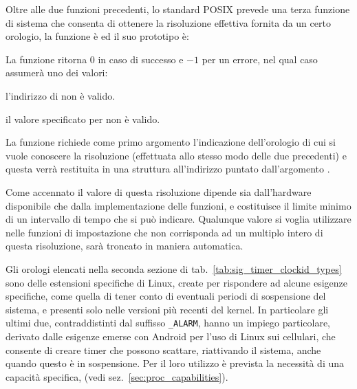 Oltre alle due funzioni precedenti, lo standard POSIX prevede una terza
funzione di sistema che consenta di ottenere la risoluzione effettiva fornita
da un certo orologio, la funzione è  ed il suo prototipo
è:

\begin{funcproto}{
}

{La funzione ritorna $0$ in caso di successo e $-1$ per un errore, nel qual
  caso  assumerà uno dei valori: 
  \begin{errlist}
  \item[\errcode{EFAULT}] l'indirizzo di  non è valido.
  \item[\errcode{EINVAL}] il valore specificato per  non è
    valido.
  \end{errlist}
}
\end{funcproto}

La funzione richiede come primo argomento l'indicazione dell'orologio di cui
si vuole conoscere la risoluzione (effettuata allo stesso modo delle due
precedenti) e questa verrà restituita in una struttura 
all'indirizzo puntato dall'argomento .

Come accennato il valore di questa risoluzione dipende sia dall'hardware
disponibile che dalla implementazione delle funzioni, e costituisce il limite
minimo di un intervallo di tempo che si può indicare. Qualunque valore si
voglia utilizzare nelle funzioni di impostazione che non corrisponda ad un
multiplo intero di questa risoluzione, sarà troncato in maniera automatica. 

Gli orologi elencati nella seconda sezione di
tab.~\ref{tab:sig_timer_clockid_types} sono delle estensioni specifiche di
Linux, create per rispondere ad alcune esigenze specifiche, come quella di
tener conto di eventuali periodi di sospensione del sistema, e presenti solo
nelle versioni più recenti del kernel. In particolare gli ultimi due,
contraddistinti dal suffisso \texttt{\_ALARM}, hanno un impiego particolare,
derivato dalle esigenze emerse con Android per l'uso di Linux sui cellulari,
che consente di creare timer che possono scattare, riattivando il sistema,
anche quando questo è in sospensione. Per il loro utilizzo è prevista la
necessità di una capacità specifica,  (vedi
sez.~\ref{sec:proc_capabilities}).

